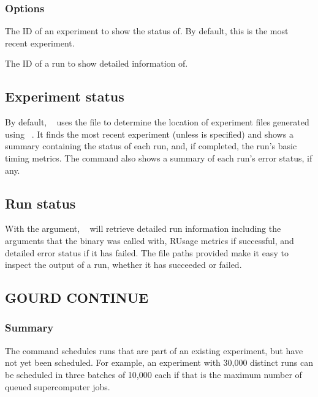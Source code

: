 \documentclass[a4paper,english]{article}
\begin{document}
\begin{adjustwidth}{18pt}{0pt}
            \subsubsection{Options}
                \begin{Description}[Options]
                \item[\Arg{experiment-id}]
                The ID of an experiment to show the status of.
                By default, this is the most recent experiment.
                \item[\OptArg{-i}{ run-id}]
                The ID of a run to show detailed information of.
                \end{Description}

            \subsection{Experiment status}
                By default, ~ uses the  file to determine the
                location of experiment files generated using ~.
                It finds the most recent experiment (unless  is specified) and shows a summary
                containing the status of each run, and, if completed, the run's basic timing metrics.
                The command also shows a summary of each run's error status, if any.

            \subsection{Run status}
                With the  argument, ~ will retrieve detailed
                run information including the arguments that the binary was called with, RUsage metrics
                if successful, and detailed error status if it has failed.
                The file paths provided make it easy to inspect the output of a run, whether it has
                succeeded or failed.

        \subsection{GOURD CONTINUE}

            \subsubsection{Summary}
                The   command schedules runs that are part of an existing
                experiment, but have not yet been scheduled.
                For example, an experiment with 30,000 distinct runs can be scheduled in three batches
                of 10,000 each if that is the maximum number of queued supercomputer jobs.



\end{adjustwidth}
\end{document}
